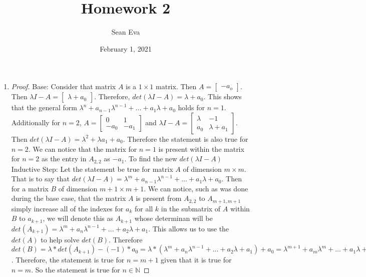 \documentclass{article}
\title{Homework 2}
\author{Sean Eva}
\date{February 1, 2021}
\begin{document}
\maketitle

\begin{enumerate}
    \item
    
    \begin{proof}
    Base: Consider that matrix $A$ is a $1 \times 1$ matrix. Then $A=\begin{bmatrix}
    -a_o
    \end{bmatrix}$. Then $\lambda I - A = \begin{bmatrix}
    \lambda + a_0
    \end{bmatrix}$. Therefore, $det(\lambda I - A)= \lambda +a_0$. This shows that the general form $\lambda^n+a_{n-1}\lambda^{n-1}+...+a_1\lambda+a_0$ holds for $n=1$.\\ Additionally for $n = 2$, $A = \begin{bmatrix}
    0 & 1\\
    -a_0 & -a_1
    \end{bmatrix}$ and $\lambda I - A = \begin{bmatrix}
    \lambda & -1\\
    a_0 & \lambda + a_1
    \end{bmatrix}$. Then $det(\lambda I - A) = \lambda^2 + \lambda a_1 + a_0$. Therefore the statement is also true for $n = 2$. We can notice that the matrix for $n = 1$ is present within the matrix for $n = 2$ as the entry in $A_{2, 2}$ as $-a_1$. To find the new $det(\lambda I - A)$ 
    Inductive Step: Let the statement be true for matrix $A$ of dimension $m\times m$. That is to say that $det(\lambda I - A) = \lambda^m + a_{n-1} \lambda^{n-1} + ... + a_1 \lambda + a_0$. Then for a matrix $B$ of dimension $m + 1 \times m + 1$. We can notice, such as was done during the base case, that the matrix $A$ is present from $A_{2, 2}$ to $A_{m+1, m+1}$ simply increase all of the indexes for $a_k$ for all $k$ in the submatrix of $A$ within $B$ to $a_{k + 1}$, we will denote this as $A_{k+1}$ whose determinan will be $det(A_{k+1}) = \lambda^m + a_{n} \lambda^{n-1} + ... + a_2 \lambda + a_1$. This allows us to use the $det(A)$ to help solve $det(B)$. Therefore $det(B) = \lambda * det(A_{k+1}) - (-1) * a_0 = \lambda * (\lambda^m + a_{n} \lambda^{n-1} + ... + a_2 \lambda + a_1) + a_0 = \lambda^{m + 1} + a_m \lambda^{m} + ... + a_1 \lambda + a_0$. Therefore, the statement is true for $n = m + 1$ given that it is true for $n = m$. So the statement is true for $n\in \mathbb{N}$
    \end{proof}
    

\end{enumerate}
\end{document}
